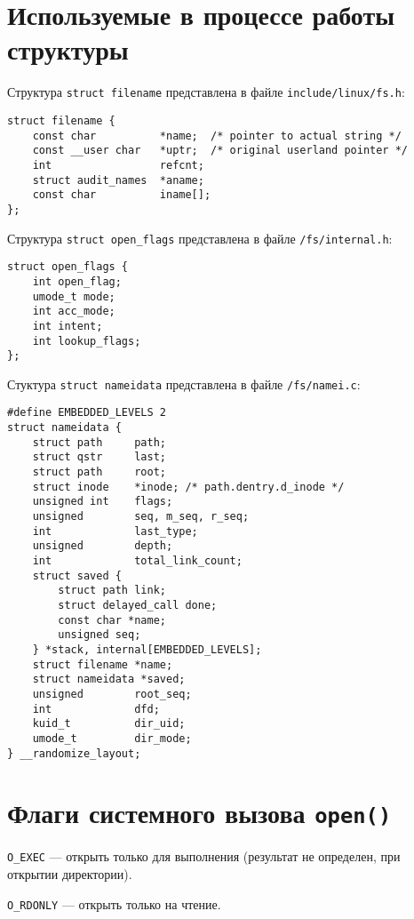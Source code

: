 \section*{Используемые в процессе работы структуры}

Структура \texttt{struct filename} представлена в файле \texttt{include/linux/fs.h}:

\begin{lstlisting}[style=cstyle]
struct filename {
    const char          *name;  /* pointer to actual string */
    const __user char   *uptr;  /* original userland pointer */
    int                 refcnt;
    struct audit_names  *aname;
    const char          iname[];
};
\end{lstlisting}

Структура \texttt{struct open\_flags} представлена в файле \texttt{/fs/internal.h}:

\begin{lstlisting}[style=cstyle]
struct open_flags {
    int open_flag;
    umode_t mode;
    int acc_mode;
    int intent;
    int lookup_flags;
};
\end{lstlisting}

Стуктура \texttt{struct nameidata} представлена в файле \texttt{/fs/namei.c}:

\begin{lstlisting}[style=cstyle]
#define EMBEDDED_LEVELS 2
struct nameidata {
    struct path     path;
    struct qstr     last;
    struct path     root;
    struct inode    *inode; /* path.dentry.d_inode */
    unsigned int    flags;
    unsigned        seq, m_seq, r_seq;
    int             last_type;
    unsigned        depth;
    int             total_link_count;
    struct saved {
        struct path link;
        struct delayed_call done;
        const char *name;
        unsigned seq;
    } *stack, internal[EMBEDDED_LEVELS];
    struct filename *name;
    struct nameidata *saved;
    unsigned        root_seq;
    int             dfd;
    kuid_t          dir_uid;
    umode_t         dir_mode;
} __randomize_layout;
\end{lstlisting}

\section*{Флаги системного вызова \texttt{open()}}

\texttt{O\_EXEC} --- открыть только для выполнения (результат не определен, при открытии директории).

\texttt{O\_RDONLY} --- открыть только на чтение.

